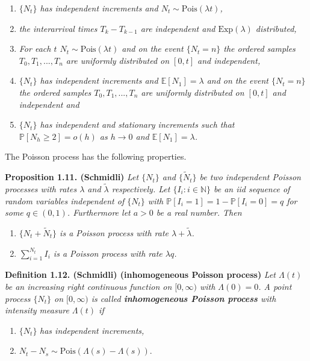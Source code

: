 \documentclass[a4paper,10pt,openany]{book}
\providecommand{\tightlist}{%
 \setlength{\itemsep}{0pt}\setlength{\parskip}{0pt}}
\begin{document}
\begin{enumerate}
\def\labelenumi{\roman{enumi})}
\tightlist
\item
  \emph{\(\{N_t\}\) has independent increments and \(N_t\sim \text{Pois}(\lambda t)\),}
\item
  \emph{the interarrival times \(T_k-T_{k-1}\) are independent and \(\text{Exp}(\lambda)\) distributed,}
\item
  \emph{For each \(t\) \(N_t\sim \text{Pois}(\lambda t)\) and on the event \(\{N_t=n\}\) the ordered samples \(T_0,T_1,...,T_n\) are uniformly distributed on \([0,t]\) and independent,}
\item
  \emph{\(\{N_t\}\) has independent increments and \(\mathbb E[N_1]=\lambda\) and on the event \(\{N_t=n\}\) the ordered samples \(T_0,T_1,...,T_n\) are uniformly distributed on \([0,t]\) and independent and}
\item
  \emph{\(\{N_t\}\) has independent and stationary increments such that \(\mathbb P[N_h\ge 2]=o(h)\) as \(h\to 0\) and \(\mathbb E[N_1]=\lambda\).}
\end{enumerate}

The Poisson process has the following properties.

\textbf{Proposition 1.11. (Schmidli)} \emph{Let \(\{N_t\}\) and \(\{\tilde N_t\}\) be two independent Poisson processes with rates \(\lambda\) and \(\tilde\lambda\) respectively. Let \(\{I_i : i \in \mathbb N\}\) be an iid sequence of random variables independent of \(\{N_t\}\) with \(\mathbb P[I_i = 1] = 1−\mathbb P[I_i = 0] = q\) for some \(q \in (0,1)\). Furthermore let \(a > 0\) be a real number. Then}

\begin{enumerate}
\def\labelenumi{\roman{enumi})}
\tightlist
\item
  \emph{\(\{N_t+\tilde N_t\}\) is a Poisson process with rate \(\lambda +\tilde \lambda\).}
\item
  \emph{\(\sum_{i=1}^{N_t}I_i\) is a Poisson process with rate \(\lambda q\).}
\end{enumerate}

\textbf{Definition 1.12. (Schmidli) (inhomogeneous Poisson process)} \emph{Let \(\Lambda(t)\) be an increasing right continuous function on \([0,\infty)\) with \(\Lambda(0) = 0\). A point process \(\{N_t\}\) on \([0, \infty)\) is called \textbf{inhomogeneous Poisson process} with intensity measure \(\Lambda(t)\) if}

\begin{enumerate}
\def\labelenumi{\roman{enumi})}
\tightlist
\item
  \(\{N_t\}\) \emph{has independent increments,}
\item
  \(N_t-N_s\sim\text{Pois}(\Lambda (s)-\Lambda(s))\).
\end{enumerate}
\end{document}
